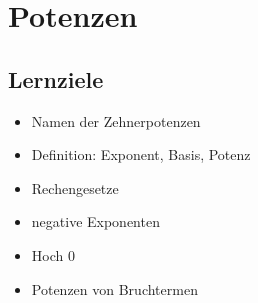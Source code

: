 
\section{Potenzen}


\subsection*{Lernziele}

\begin{itemize}
\item Namen der Zehnerpotenzen
\item Definition: Exponent, Basis, Potenz
\item Rechengesetze
\item negative Exponenten
\item Hoch 0
\item Potenzen von Bruchtermen
\end{itemize}
\newpage






